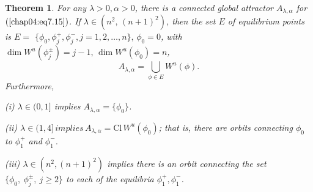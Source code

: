 \documentclass{surv-l}
\theoremstyle{plain}
\newtheorem{theorem}{Theorem}[section]
\theoremstyle{definition}
\numberwithin{equation}{section}
\numberwithin{figure}{chapter}
\begin{document}
\begin{theorem}\label{thm4.7.6} For any $\lambda>0, \alpha>0$, there is a connected global attractor $A_{\lambda,\alpha}$ for $(\ref{chap04:eq7.15})$. If $\lambda\in(n^{2},\, (n+1)^{2})$, then the set $E$ of equilibrium points is $E=$
$\{\phi_{0}, \phi_{j}^{+}, \phi_{j}^{-}, j=1,2,\ldots, n\},\, \phi_{0}=0$, with $\dim W^{u}(\phi_{j}^{\pm})=j-1,\, \dim W^{u}(\phi_{0})= n$,
\begin{equation*}
A_{\lambda,\alpha}=\bigcup_{\phi\in E} W^{u}(\phi).
\end{equation*}
Furthermore,

\emph{(i)} $\lambda\in(0, 1]$ implies $A_{\lambda,\alpha}=\{\phi_{0}\}$.

\emph{(ii)} $\lambda\in(1,4] \, implies \, A_{\lambda,\alpha}= \mathrm{Cl} \,W^{u}(\phi_{0})$; that is, there are orbits connecting $\phi_{0}$ to $\phi_{1}^{+}$ and $\phi_{1}^{-}$.

\emph{(iii)} $\lambda\in(n^{2}, (n+1)^{2})$ implies there is an orbit connecting the set $\{\phi_{0},\ \phi_{j}^{\pm},\ j\geq 2\}$ to each of the equilibria $\phi_{1}^{+}, \phi_{1}^{-}$.
\end{theorem}
\end{document}
